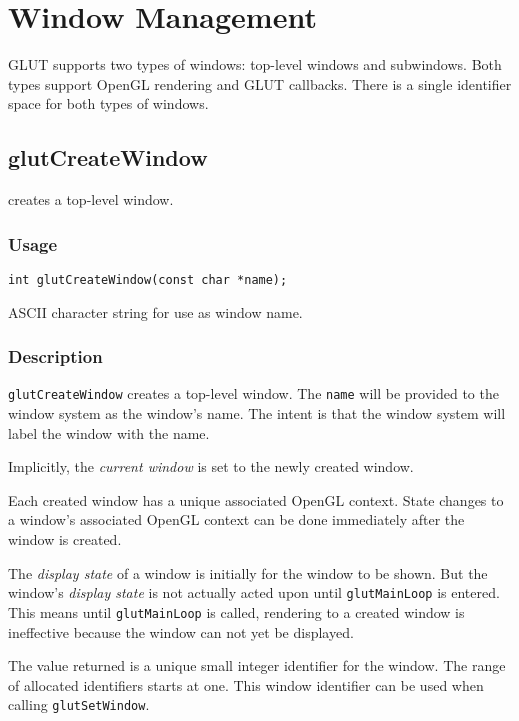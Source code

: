 \section{Window Management}

GLUT supports two types of windows:  top-level windows and subwindows.
Both types support OpenGL rendering and GLUT callbacks.  There is a
single identifier space for both types of windows.

\subsection{glutCreateWindow}

 creates a top-level window.

\subsubsection*{Usage}
\begin{verbatim}
int glutCreateWindow(const char *name);
\end{verbatim}
\begin{description}
\itemsep 0in
\item[{\tt name}]
ASCII character string for use as window name.
\end{description}

\subsubsection*{Description}
{\tt glutCreateWindow} creates a top-level window.  The {\tt name} will
be provided to the window system as the window's name.  The intent is that the
window system will label the window with the name.

Implicitly, the {\em current window} is set to the newly created window.

Each created window has a unique associated OpenGL context.  State changes to
a window's associated OpenGL context can be done immediately after the
window is created.

The {\em display state} of a window is initially for the window
to be shown.  But the window's {\em display state} is not actually
acted upon until {\tt glutMainLoop} is entered.  This means until {\tt glutMainLoop}
is called, rendering to a created window is ineffective because the window
can not yet be displayed.

The value returned is a unique small integer identifier for the window.  The
range of allocated identifiers starts at one.  This window identifier
can be used when calling {\tt glutSetWindow}.

